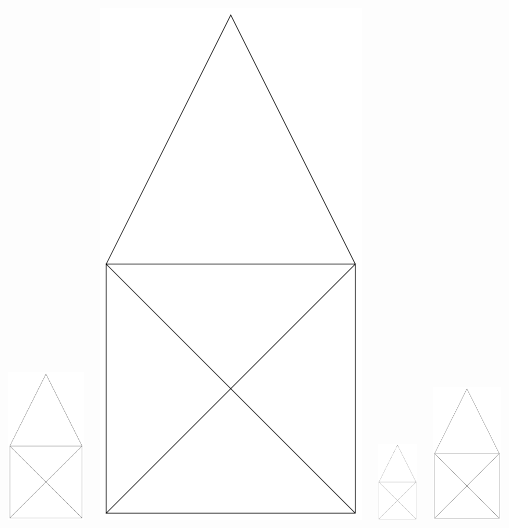 \documentclass[varwidth]{standalone}
\begin{document}
\includegraphics[width=2cm]{house/house.png} ~ 
\includegraphics[scale=0.22,angle=90]{house/house.png} ~ 
\includegraphics[height=2cm,viewport=0 0 47mm 90mm,clip=true]{house/house.png} ~ 
\includegraphics[width=1.8cm,trim=5mm 10mm 15mm 20mm,clip=true]{house/house.png} ~ 
\end{document}
